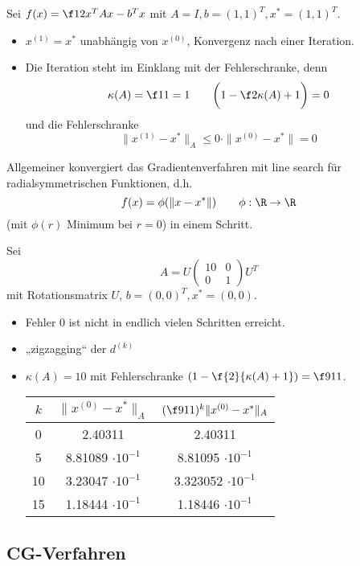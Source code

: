\documentclass[11pt]{scrbook}
\begin{document}
\begin{ex*}
	Sei $f(x) = \f 12 x^T A x - b^Tx$ mit $A = I, b = (1,1)^T, x^* = (1,1)^T$.
	\begin{itemize}
		\item
			$x^{(1)} = x^*$ unabhängig von $x^{(0)}$, Konvergenz nach einer Iteration.
		\item
			Die Iteration steht im Einklang mit der Fehlerschranke, denn
			\[
				\kappa(A) = \f 11 = 1
				\qquad
				\bigg( 1 - \f 2{\kappa(A) + 1}\bigg) = 0
			\]
			und die Fehlerschranke
			\[
				\|x^{(1)} - x^*\|_A \le 0 \cdot \|x^{(0)} - x^*\| = 0
			\]
	\end{itemize}
	Allgemeiner konvergiert das Gradientenverfahren mit line search für radialsymmetrischen Funktionen, d.h.
	\[
		f(x) = \phi(\|x-x^*\|)
		\qquad \phi : \R \to \R
	\]
	(mit $\phi(r)$ Minimum bei $r=0$) in einem Schritt.
\end{ex*}

\begin{ex*}
	Sei
	\[
		A = U \begin{pmatrix}
			10 & 0 \\
			0 & 1
		\end{pmatrix} U^T
	\]
	mit Rotationsmatrix $U$, $b = (0,0)^T, x^* = (0,0)$.
	\begin{itemize}
		\item
			Fehler $0$ ist nicht in endlich vielen Schritten erreicht.
		\item
			„zigzagging“ der $d^{(k)}$
		\item
			$\kappa(A) = 10$ mit Fehlerschranke $(1- \f {2}{\kappa(A)+1}) = \f 9{11}$.
			\begin{table}[h]
				\centering
				\begin{tabular}{c|c|c}
					$k$ & $\|x^{(0)} - x^*\|_A$ & $(\f 9{11})^k \|x^{(0)} - x^*\|_A$ \\ \hline
					0 & 2.40311 & 2.40311 \\
					5 & 8.81089 $\cdot 10^{-1}$ & 8.81095 $\cdot 10^{-1}$ \\
					10 & 3.23047 $\cdot 10^{-1}$ & 3.323052 $\cdot 10^{-1}$ \\
					15 & 1.18444 $\cdot 10^{-1} $& 1.18446 $\cdot 10^{-1}$
				\end{tabular}
			\end{table}
	\end{itemize}
\end{ex*}


\subsection{CG-Verfahren}
\end{document}
